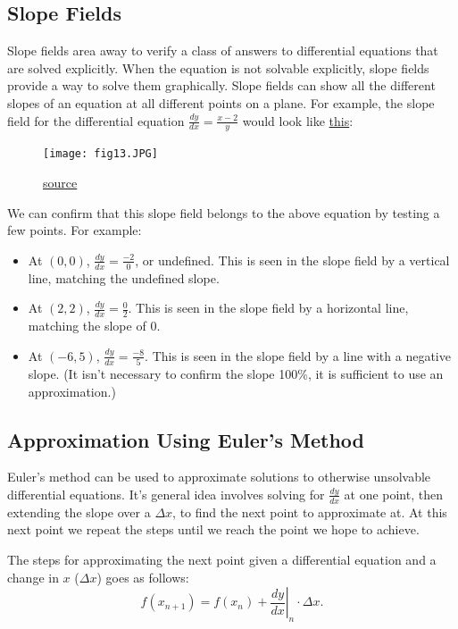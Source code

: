 \documentclass[12pt]{article}
\begin{document}
\subsection{Slope Fields}
Slope fields area away to verify a class of answers to differential equations that are solved explicitly. When the equation is not solvable explicitly, slope fields provide a way to solve them graphically. Slope fields can show all the different slopes of an equation at all different points on a plane. For example, the slope field for the differential equation $\frac{dy}{dx} = \frac{x-2}{y}$ would look like \hyperref[fig:slopefield1]{this}:

\begin{figure}[H]
    \begin{center}
        \texttt{[image: fig13.JPG]}
        \caption{\href{https://www.khanacademy.org/math/ap-calculus-bc/bc-differential-equations-new}{source}}
        \label{fig:slopefield1}
    \end{center}
\end{figure}

We can confirm that this slope field belongs to the above equation by testing a few points. For example:
\begin{itemize}
    \item At $(0, 0)$, $\frac{dy}{dx} = \frac{-2}{0}$, or undefined. This is seen in the slope field by a vertical line, matching the undefined slope.
    \item At $(2, 2)$, $\frac{dy}{dx} = \frac{0}{2}$. This is seen in the slope field by a horizontal line, matching the slope of $0$.
    \item At $(-6, 5)$, $\frac{dy}{dx} = \frac{-8}{5}$. This is seen in the slope field by a line with a negative slope. (It isn't necessary to confirm the slope 100\%, it is sufficient to use an approximation.)
\end{itemize}

\subsection{Approximation Using Euler's Method}
Euler's method can be used to approximate solutions to otherwise unsolvable differential equations. It's general idea involves solving for $\frac{dy}{dx}$ at one point, then extending the slope over a $\Delta x$, to find the next point to approximate at. At this next point we repeat the steps until we reach the point we hope to achieve.

The steps for approximating the next point given a differential equation and a change in $x$ ($\Delta x$) goes as follows:
\[ f(x_{n+1}) = f(x_n) + \left. \frac{dy}{dx} \right \vert_n \cdot \Delta x. \]
\end{document}
